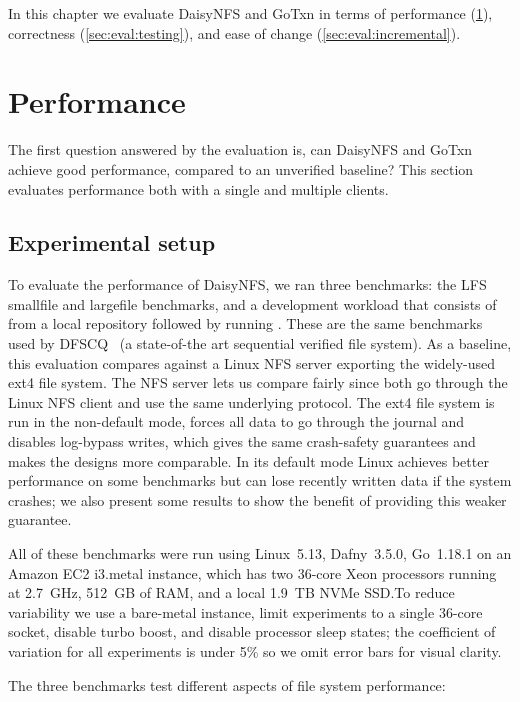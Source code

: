 In this chapter we evaluate DaisyNFS and GoTxn in terms of performance
(\cref{sec:eval:perf}), correctness (\cref{sec:eval:testing}),
and ease of change (\cref{sec:eval:incremental}).

\section{Performance}
\label{sec:eval:perf}

The first question answered by the evaluation is, can DaisyNFS and GoTxn achieve
good performance, compared to an unverified baseline? This section evaluates
performance both with a single and multiple clients.

\subsection{Experimental setup}

To evaluate the performance of DaisyNFS, we ran three benchmarks: the LFS smallfile
and largefile benchmarks, and a development workload that consists of  from a local repository followed by running . These are the same
benchmarks used by DFSCQ~\cite{chen:dfscq} (a state-of-the art sequential
verified file system). As a baseline, this evaluation compares against a Linux
NFS server exporting the widely-used ext4 file system.
The NFS server lets us compare fairly since both go through the Linux NFS client
and use the same underlying protocol. The ext4 file system is run in the
non-default  mode, forces all data to
go through the journal and disables log-bypass writes, which gives the same
crash-safety guarantees and makes the designs more comparable. In its default
 mode Linux achieves better performance on some benchmarks but
can lose recently written data if the system crashes; we also present some results to
show the benefit of providing this weaker guarantee.

All of these benchmarks were run using Linux~5.13, Dafny~3.5.0, Go~1.18.1 on an Amazon
EC2 i3.metal instance, which has two 36-core Xeon processors running at 2.7~GHz, 512~GB of RAM, and a local 1.9~TB
NVMe SSD.\@ To reduce variability we use a bare-metal instance, limit experiments to a single 36-core
socket, disable turbo boost, and disable processor sleep states; the coefficient
of variation for all experiments is under 5\% so we omit error bars for visual
clarity.

The three benchmarks test different aspects of file system performance:

